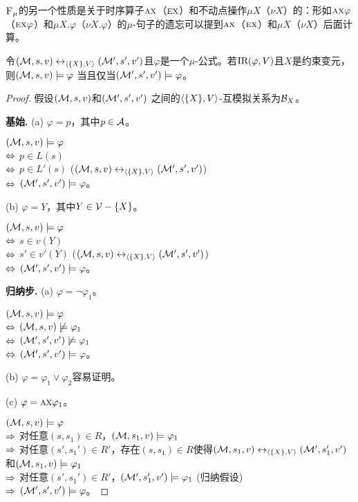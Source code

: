 ${\textsc{F}_{\textsc{$\mu$}}}$的另一个性质是关于时序算子$\textsc{a}\textsc{x}$（$\textsc{e} \textsc{x}$）和不动点操作$\mu X$（$\nu X$）的：形如$\textsc{a}\textsc{x} \varphi$（$\textsc{e} \textsc{x} \varphi$）和$\mu X. \varphi$（$\nu X. \varphi$）的$\mu$-句子的遗忘可以提到$\textsc{a}\textsc{x}$（$\textsc{e} \textsc{x}$）和$\mu X$（$\nu X$）后面计算。
\begin{lemma}
	\label{cor:VarInvariant}
	令$({\cal M},s,v) \leftrightarrow_{{\langle{\{X\},V}\rangle}} ({\cal M}',s',v')$且$\varphi$是一个$\mu$-公式。若$\textrm{IR}(\varphi,V)$且$X$是约束变元，则$({\cal M},s,v) \models \varphi$ 当且仅当$({\cal M}',s',v') \models \varphi$。
\end{lemma}
\begin{proof}
	假设$({\cal M},s,v)$和$({\cal M}',s',v')$ 之间的${{\langle{\{X\},V}\rangle}}$-互模拟关系为${\cal B}_X$。%
	
	\textbf{基始.} (a) $\varphi = p$，其中$p \in {\cal A}$。
	
	$({\cal M},s,v) \models \varphi$ \\
	$\Leftrightarrow$ $p \in L(s)$\\
	$\Leftrightarrow$ $p \in L'(s)$ \hfill ($({\cal M},s,v) \leftrightarrow_{{\langle{\{X\},V}\rangle}} ({\cal M}',s',v')$)\\
	$\Leftrightarrow$ $({\cal M}',s',v') \models \varphi$。
	
	(b) $\varphi = Y$，其中$Y \in {\cal V}-\{X\}$。
	
	$({\cal M},s,v) \models \varphi$ \\
	$\Leftrightarrow$ $s\in v(Y)$\\
	$\Leftrightarrow$ $s' \in v'(Y)$ \hfill ($({\cal M},s,v) \leftrightarrow_{{\langle{\{X\},V}\rangle}} ({\cal M}',s',v')$)\\
	$\Leftrightarrow$ $({\cal M}',s',v') \models \varphi$。
	
	
	
	
	
	
	\textbf{归纳步.} (a) $\varphi = \neg \varphi_1$。
	
	$({\cal M},s,v) \models \varphi$\\
	$\Leftrightarrow$ $({\cal M},s,v) \not \models \varphi_1$ \\
	$\Leftrightarrow$ $({\cal M}',s', v') \not \models \varphi_1$ \\
	$\Leftrightarrow$ $({\cal M}',s',v') \models \varphi$。
	
	
	(b) $\varphi = \varphi_1 \vee \varphi_2$容易证明。
	
	(c) $\varphi = \textsc{a} \textsc{x} \varphi_1$。
	
	$({\cal M},s,v) \models \varphi$ \\
	$\Rightarrow$ 对任意$(s, s_1) \in R$，$({\cal M},s_1,v) \models \varphi_1$\\
	$\Rightarrow$ 对任意$(s',s_1') \in R'$，存在$(s,s_1)\in R$使得$({\cal M}, s_1,v) \leftrightarrow_{{\langle{\{X\},V}\rangle}} ({\cal M}',s_1',v')$和$({\cal M},s_1,v) \models \varphi_1$\\
	$\Rightarrow$ 对任意$(s',s_1') \in R'$，$({\cal M}',s_1',v') \models \varphi_1$ \hfill (归纳假设)\\
	$\Rightarrow$ $({\cal M}',s',v') \models \varphi$。
	

\end{proof}

